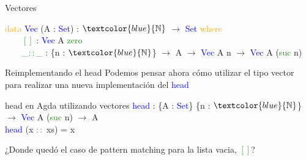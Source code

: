 \documentclass[xcolor=dvipsnames]{beamer} %
\newcommand{\cf}[1]{\textcolor{blue}{#1}}
\newcommand{\ct}[1]{\textcolor{blue}{#1}}
\newcommand{\cc}[1]{\textcolor{ForestGreen}{#1}}
\newcommand{\ck}[1]{\textcolor{orange}{#1}}
\newcommand{\N}{\ct{\mathbb{N}}}
\newcommand{\ra}{\rightarrow}
\newcommand{\T}{ \ \ \ \ }
\begin{document}
\begin{frame}

\begin{block}{Vectores}

\ck{data} \ct{Vec} (A : \ct{Set}) : $\N$ $\ra$ \ct{Set} \ck{where}\\
\T \cc{$[]$}     : \ct{Vec} A \cc{zero}\\
\T \cc{\_$::$\_} : \{n : $\N$\} $\ra$ A $\ra$ \ct{Vec} A n $\ra$ \ct{Vec} A (\cc{suc} n)

\end{block}

\begin{block}{Reimplementando el head}
Podemos pensar ahora cómo utilizar el tipo vector para realizar una
nueva implementación del \cf{head}
\end{block}

\pause

\begin{block}{head en Agda utilizando vectores}
    \cf{head} : \{A : \ct{Set}\} \{n : $\N$\} $\ra$ \ct{Vec} A (\cc{suc} n) $\ra$ A \\
    \pause
    \cf{head} (x \cc{$::$} xs) = x
\end{block}

\pause

\begin{block}{}
¿Donde quedó el caso de pattern matching para la lista vacia, \cc{$[]$}?
\end{block}

\end{frame}
\end{document}
